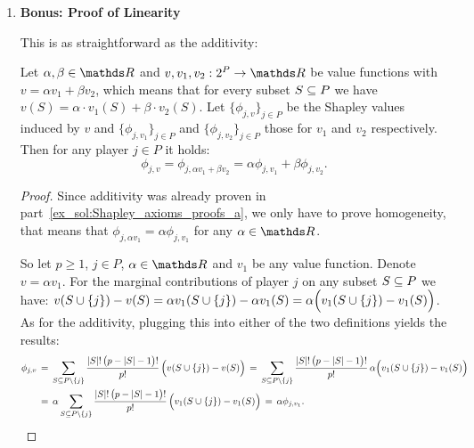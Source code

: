 {\begin{enumerate}
    
    
    \item \textbf{Bonus: Proof of Linearity}

    This is as straightforward as the additivity:

    \begin{theorem}[Linearity]
    Let $\alpha, \beta \in \R$ and $v, v_1, v_2 : 2^P \to \R$ be value functions with $v = \alpha v_1 + \beta v_2$, which means that for every subset $S \subseteq P$ we have $v(S) = \alpha \cdot v_1(S) + \beta \cdot v_2(S)$.
    Let $\{\phi_{j, v}\}_{j \in P}$ be the Shapley values induced by $v$ and $\{\phi_{j, v_1}\}_{j \in P}$ and $\{\phi_{j, v_2}\}_{j \in P}$ those for $v_1$ and $v_2$ respectively.
    Then for any player $j \in P$ it holds:
    $$
    \phi_{j, v} = \phi_{j, \alpha v_1 + \beta v_2} = \alpha \phi_{j, v_1} + \beta \phi_{j, v_2}.
    $$
    \end{theorem}

    \begin{proof}

        Since additivity was already proven in part~\ref{ex_sol:Shapley_axioms_proofs_a}, we only have to prove homogeneity, that means that $\phi_{j, \alpha v_1} = \alpha \phi_{j, v_1}$ for any $\alpha \in \R$.

        So let $p \geq 1$, $ j \in P$, $\alpha \in \R$ and $v_1$ be any value function.
        Denote $v = \alpha v_1$.        
        For the marginal contributions of player $j$ on any subset $S \subseteq P$ we have: $v(S \cup \{j\}) - v(S) = \alpha v_1(S \cup \{j\}) - \alpha v_1(S) = \alpha \Bigl( v_1(S \cup \{j\}) - v_1(S) \Bigr)$.
        As for the additivity, plugging this into either of the two definitions yields the results:
        \begin{align*}
            \phi_{j, v}
            & \,=\, \sum_{S \subseteq P \setminus \{j\}} \frac{|S|!\,\bigl(p - |S| - 1\bigr)!}{p!} \, \Bigl( v(S \cup \{j\}) - v(S) \Bigr) 
            \,=\, \sum_{S \subseteq P \setminus \{j\}} \frac{|S|!\,\bigl(p - |S| - 1\bigr)!}{p!} \, \alpha \Bigl( v_1(S \cup \{j\}) - v_1(S) \Bigr) \\
            & \,=\, \alpha \sum_{S \subseteq P \setminus \{j\}} \frac{|S|!\,\bigl(p - |S| - 1\bigr)!}{p!} \, \Bigl( v_1(S \cup \{j\}) - v_1(S) \Bigr) 
            \,=\, \alpha \phi_{j, v_1}.
        \end{align*}
        
    \end{proof}

\end{enumerate}

}

